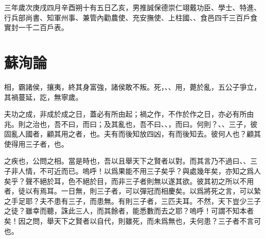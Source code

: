 三年歲次庚戌四月辛酉朔十有五日乙亥，男推誠保德崇仁翊戴功臣、學士、特進、行兵部尚書、知軍州事、兼管內勸農使、充安撫使、上柱國、、食邑四千三百戶食實封一千二百戶表。

\theendnotes

\section[管仲論\quad{\small 蘇洵}]{{\normalsize 蘇洵}\quad{}論}
相，霸諸侯，攘夷，終其身富強，諸侯敢不叛。死，、、用，薨於亂，五公子爭立，其禍蔓延，訖，無寧歲。

夫功之成，非成於成之日，蓋必有所由起；禍之作，不作於作之日，亦必有所由兆。{則}之治也，吾不曰，而曰；及其亂也，吾不曰、、，而曰。何則？、、三子，彼固亂人國者，顧其用之者，也。夫有而後知放四凶，有而後知去。彼何人也？顧其使得用三子者，也。

之疾也，公問之相。當是時也，吾以且舉天下之賢者以對。而其言乃不過曰、、三子非人情，不可近而已。嗚呼！以爲果能不用三子矣乎？與處幾年矣，亦知之爲人矣乎？聲不絕於耳，色不絕於目，而非三子者則無以遂其欲。彼其初之所以不用者，徒以有焉耳。一日無，則三子者，可以彈冠而相慶矣。以爲將死之言，可以縶之手足耶？夫不患有三子，而患無。有則三子者，三匹夫耳。不然，天下豈少三子之徒？雖幸而聽，誅此三人，而其餘者，能悉數而去之耶？嗚呼！可謂不知本者矣！因之問，舉天下之賢者以自代，則雖死，而未爲無也，夫何患？三子者不言可也。

